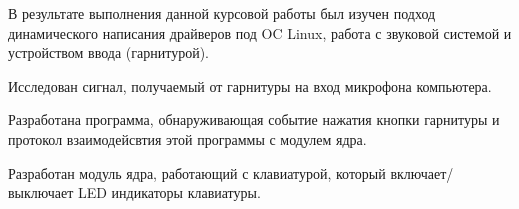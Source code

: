 \Conclusion

В результате выполнения данной курсовой работы был изучен подход динамического написания драйверов под OC Linux, работа с звуковой системой и устройством ввода (гарнитурой).

Исследован сигнал, получаемый от гарнитуры на вход микрофона компьютера. 

Разработана программа, обнаруживающая событие нажатия кнопки гарнитуры и протокол взаимодейсвтия этой программы с модулем ядра. 

Разработан модуль ядра, работающий с клавиатурой, который включает/выключает LED индикаторы клавиатуры. 

